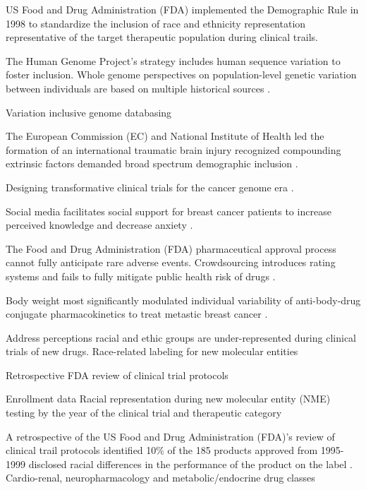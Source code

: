 \documentclass[10pt]{article}
\begin{document}
US Food and Drug Administration (FDA) implemented the Demographic Rule in 1998 to standardize the inclusion of race and ethnicity representation representative of the target therapeutic population during clinical trails.  

The Human Genome Project's strategy includes human sequence variation to foster inclusion. Whole genome perspectives on population-level genetic variation between individuals are based on multiple historical sources \cite{foster2004beyond}. 

Variation inclusive genome databasing 

The European Commission (EC) and National Institute of Health led the formation of an international traumatic brain injury recognized compounding extrinsic factors demanded broad spectrum demographic inclusion \cite{tosetti2013toward}.

Designing transformative clinical trials for the cancer genome era \cite{sleijfer2013designing}.

Social media facilitates social support for breast cancer patients to increase perceived knowledge and decrease anxiety  \cite{attai2015twitter}.

The Food and Drug Administration (FDA) pharmaceutical approval process cannot fully anticipate rare adverse events. Crowdsourcing introduces rating systems and fails to fully mitigate public health risk of drugs \cite{darrow2014crowdsourcing}.

Body weight most significantly modulated individual variability of anti-body-drug conjugate pharmacokinetics to treat metastic breast cancer \cite{gupta2012clinical}.

Address perceptions racial and ethic groups are under-represented during clinical trials of new drugs. Race-related labeling for new molecular entities  \cite{evelyn2001participation}

Retrospective FDA review of clinical trial protocols 

Enrollment data Racial representation during new molecular entity (NME) testing by the year of the clinical trial and therapeutic category 

A retrospective of the US Food and Drug Administration (FDA)'s review of clinical trail protocols identified 10\% of the 185 products approved from 1995-1999 disclosed racial differences in the performance of the product on the label \cite{evelyn2001participation}.  Cardio-renal, neuropharmacology and metabolic/endocrine drug classes 
\end{document}
